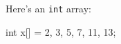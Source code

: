 Here's an \texttt{int} array:



\begin{consolethree}[escapeinside=||]

int x[] = {2, 3, 5, 7, 11, 13};

\end{consolethree}

